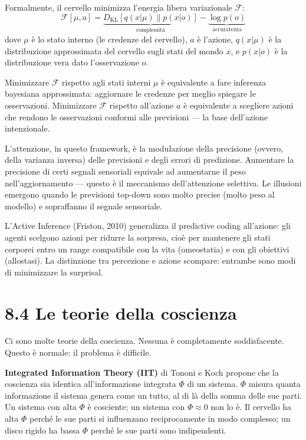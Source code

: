 \documentclass[11.5pt,a4paper,openany]{book}
\theoremstyle{remark}
\begin{document}
Formalmente, il cervello minimizza l'energia libera variazionale $\mathcal{F}$:
\[
\mathcal{F}[\mu, a] = \underbrace{D_{\text{KL}}[q(x|\mu) \| p(x|o)]}_{\text{complessità}} - \underbrace{\log p(o)}_{\text{accuratezza}}
\]
dove $\mu$ è lo stato interno (le credenze del cervello), $a$ è l'azione, $q(x|\mu)$ è la distribuzione approssimata del cervello sugli stati del mondo $x$, e $p(x|o)$ è la distribuzione vera dato l'osservazione $o$.

Minimizzare $\mathcal{F}$ rispetto agli stati interni $\mu$ è equivalente a fare inferenza bayesiana approssimata: aggiornare le credenze per meglio spiegare le osservazioni. Minimizzare $\mathcal{F}$ rispetto all'azione $a$ è equivalente a scegliere azioni che rendono le osservazioni conformi alle previsioni --- la base dell'azione intenzionale.

L'attenzione, in questo framework, è la modulazione della precisione (ovvero, della varianza inversa) delle previsioni e degli errori di predizione. Aumentare la precisione di certi segnali sensoriali equivale ad aumentarne il peso nell'aggiornamento --- questo è il meccanismo dell'attenzione selettiva. Le illusioni emergono quando le previsioni top-down sono molto precise (molto peso al modello) e sopraffanno il segnale sensoriale.

L'Active Inference (Friston, 2010) generalizza il predictive coding all'azione: gli agenti scelgono azioni per ridurre la sorpresa, cioè per mantenere gli stati corporei entro un range compatibile con la vita (omeostatia) e con gli obiettivi (allostasi). La distinzione tra percezione e azione scompare: entrambe sono modi di minimizzare la surprisal.

\section{8.4 Le teorie della coscienza}

Ci sono molte teorie della coscienza. Nessuna è completamente soddisfacente. Questo è normale: il problema è difficile.

\textbf{Integrated Information Theory (IIT)} di Tononi e Koch propone che la coscienza sia identica all'informazione integrata $\Phi$ di un sistema. $\Phi$ misura quanta informazione il sistema genera come un tutto, al di là della somma delle sue parti. Un sistema con alta $\Phi$ è cosciente; un sistema con $\Phi \approx 0$ non lo è. Il cervello ha alta $\Phi$ perché le sue parti si influenzano reciprocamente in modo complesso; un disco rigido ha bassa $\Phi$ perché le sue parti sono indipendenti.
\end{document}
